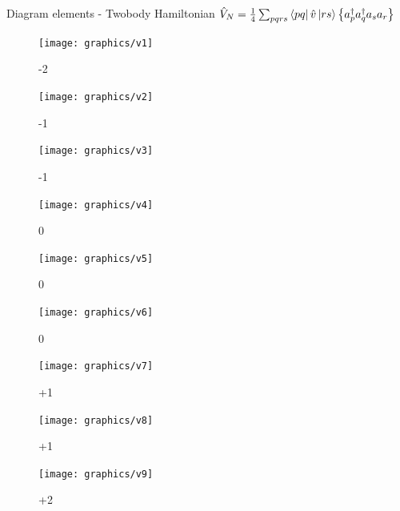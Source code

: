 \begin{frame}{Diagram elements - Twobody Hamiltonian $\hat{V}_N=\frac{1}{4} \sum_{pqrs} \bra{pq}\hat{v}\,|{rs}\rangle \left\{a^\dagger_p a^\dagger_q a_s  a_r\right\}$}
    \renewcommand{\figurename}{Level}

    \begin{figure}
    \centering
    \parbox{0.30\textwidth}{
            \centering
            \texttt{[image: graphics/v1]}
            \caption{-2}
        }\quad
        \parbox{0.30\textwidth}{
            \centering
            \texttt{[image: graphics/v2]}
            \caption{-1}
        }\quad
        \parbox{0.30\textwidth}{
            \centering
            \texttt{[image: graphics/v3]}
            \caption{-1}
        }
    \end{figure}

    \begin{figure}
    \centering
    \parbox{0.30\textwidth}{
            \centering
            \texttt{[image: graphics/v4]}
            \caption{0}
        }\quad
        \parbox{0.30\textwidth}{
            \centering
            \texttt{[image: graphics/v5]}
            \caption{0}
        }\quad
        \parbox{0.30\textwidth}{
            \centering
            \texttt{[image: graphics/v6]}
            \caption{0}
        }
    \end{figure}

    \begin{figure}
    \centering
    \parbox{0.30\textwidth}{
            \centering
            \texttt{[image: graphics/v7]}
            \caption{+1}
        }\quad
        \parbox{0.30\textwidth}{
            \centering
            \texttt{[image: graphics/v8]}
            \caption{+1}
        }\quad
        \parbox{0.30\textwidth}{
            \centering
            \texttt{[image: graphics/v9]}
            \caption{+2}
        }
    \end{figure}

\end{frame}

